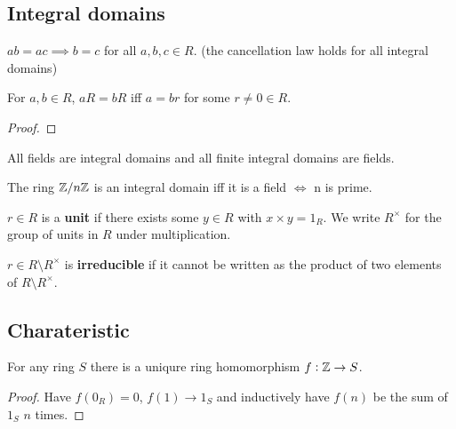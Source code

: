 \documentclass[../Year2.tex]{subfiles}
\begin{document}
\subsection{Integral domains}

\begin{theorem}
    $ab=ac\implies b=c$ for all $a,b,c\in R$. (the cancellation law holds for all integral domains)
\end{theorem}

\begin{proposition}
    For $a,b\in R$, $aR=bR$ iff $a=br$ for some $r\neq 0 \in R$.
    \begin{proof}
        
    \end{proof}
\end{proposition}

\begin{theorem}
    All fields are integral domains and all finite integral domains are fields.
\end{theorem}

\begin{remark}
    The ring $\mathbb{Z}/n\mathbb{Z}$ is an integral domain iff it is a field $\iff$ n is prime.
\end{remark}

\begin{definition}[Unit]
    $r\in R$ is a \textbf{unit} if there exists some $y\in R$ with $x\times y=1_R$. We write  $R^\times$ for the group of units in $R$ under multiplication.
\end{definition}

\begin{definition}[Irreducible]
    $r\in R\setminus R^\times$ is \textbf{irreducible} if it cannot be written as the product of two elements of $R\setminus R^\times$.
\end{definition}

\subsection{Charateristic}

\begin{lemma}
    For any ring $S$ there is a uniqure ring homomorphism $f:\mathbb{Z}\rightarrow S$.
    \begin{proof}
        Have $f(0_R)=0$, $f(1)\rightarrow 1_S$ and inductively have $f(n)$ be the sum of $1_S$ $n$ times.
    \end{proof}
\end{lemma}
\end{document}
